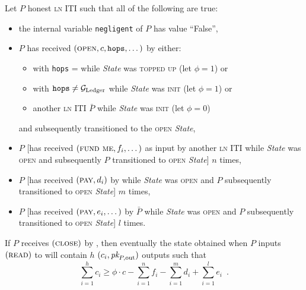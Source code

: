 \begin{lemma}
  Let $P$ honest \textsc{ln} ITI such that all of the following are true:
  \begin{itemize}
    \item the internal variable \texttt{negligent} of $P$ has value ``False'',
    \item $P$ has received $(\textsc{open}, c, \texttt{hops}, \dots)$ by either:
    \begin{itemize}
      \item \environment with \texttt{hops} = \ledger while \textit{State} was
      \textsc{topped up} (let $\phi = 1$) or
      \item \environment with $\texttt{hops} \neq \mathcal{G}_{\mathrm{Ledger}}$ while \textit{State}
      was \textsc{init} (let $\phi = 1$) or
      \item another \textsc{ln} ITI $\bar{P}$ while \textit{State} was
      \textsc{init} (let $\phi = 0$)
    \end{itemize}
    and subsequently transitioned to the \textsc{open} \textit{State},
    \item $P$ [has received $(\textsc{fund me}, f_i, \dots)$ as input by another
    \textsc{ln} ITI while \textit{State} was \textsc{open} and subsequently $P$
    transitioned to \textsc{open} \textit{State}] $n$ times,
    \item $P$ [has received $(\textsc{pay}, d_i)$ by \environment while
    \textit{State} was \textsc{open} and $P$ subsequently transitioned to
    \textsc{open} \textit{State}] $m$ times,
    \item $P$ [has received $(\textsc{pay}, e_i, \dots)$ by $\bar{P}$ while
    \textit{State} was \textsc{open} and $P$ subsequently transitioned to
    \textsc{open} \textit{State}] $l$ times.
  \end{itemize}
  If $P$ receives $(\textsc{close})$ by \environment, then eventually the state
  obtained when $P$ inputs $(\textsc{read})$ to \ledger will contain $h$ $(c_i,
  \textit{pk}_{P, \mathrm{out}})$ outputs such that
  \begin{equation}
    \sum\limits_{i=1}^h c_i \geq \phi \cdot c - \sum\limits_{i=1}^n f_i -
    \sum\limits_{i=1}^m d_i + \sum\limits_{i=1}^l e_i \enspace.
  \end{equation}
\end{lemma}
